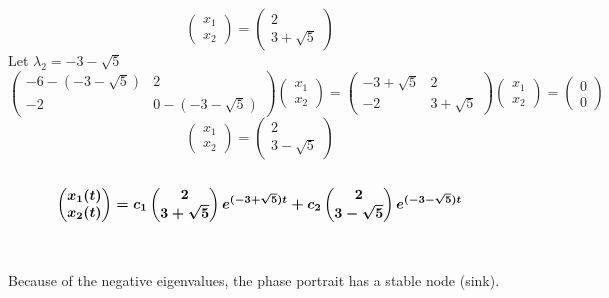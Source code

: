 \documentclass[12pt]{article}
\begin{document}
$$
\begin{pmatrix}
	x_1 \\
	x_2
\end{pmatrix} = 
\begin{pmatrix}
	2 \\
	3 + \sqrt{5}
\end{pmatrix}
$$
Let $\lambda_2 = -3 - \sqrt{5}$
$$
\begin{pmatrix}
	-6 - (-3 - \sqrt{5}) & 2 \\
	-2 & 0 - (-3 - \sqrt{5})
\end{pmatrix}
\begin{pmatrix}
	x_1 \\
	x_2
\end{pmatrix} = 
\begin{pmatrix}
	-3 + \sqrt{5} & 2 \\
	-2 & 3 + \sqrt{5}
\end{pmatrix}
\begin{pmatrix}
	x_1 \\
	x_2
\end{pmatrix} = 
\begin{pmatrix}
	0 \\
	0
\end{pmatrix}
$$
$$
\begin{pmatrix}
	x_1 \\
	x_2
\end{pmatrix} = 
\begin{pmatrix}
	2 \\
	3 - \sqrt{5}
\end{pmatrix}
$$ \\
$$
\boldmath
\begin{pmatrix}
	x_1(t) \\
	x_2(t)
\end{pmatrix} = 
c_1 
\begin{pmatrix}
	2 \\
	3 + \sqrt{5}
\end{pmatrix}
e^{(-3 + \sqrt{5})t} + 
c_2 
\begin{pmatrix}
	2 \\
	3 - \sqrt{5}
\end{pmatrix}
e^{(-3 - \sqrt{5})t}
$$ \\ \\
Because of the negative eigenvalues, the phase portrait has a stable node (sink).
\newpage 
\end{document}
